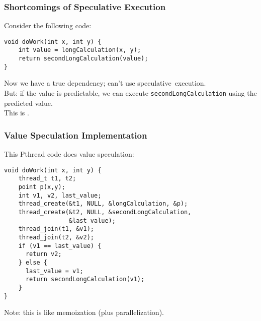 \begin{frame}[fragile]
  \frametitle{Shortcomings of Speculative Execution}

  
  Consider the following code:
  
  \begin{lstlisting}
void doWork(int x, int y) {
    int value = longCalculation(x, y);
    return secondLongCalculation(value);
}
  \end{lstlisting}

  Now we have a true dependency; can't use speculative~execution.\\[1em]

  But: if the value is predictable, we can execute
      {\tt secondLongCalculation} using the predicted value.\\[1em]

  This is .
  
\end{frame}

\begin{frame}[fragile]
  \frametitle{Value Speculation Implementation}

  
  This Pthread code does value speculation:
  
  \begin{lstlisting}
void doWork(int x, int y) {
    thread_t t1, t2;
    point p(x,y);
    int v1, v2, last_value;
    thread_create(&t1, NULL, &longCalculation, &p);
    thread_create(&t2, NULL, &secondLongCalculation,
                  &last_value);
    thread_join(t1, &v1);
    thread_join(t2, &v2);
    if (v1 == last_value) {
      return v2;
    } else {
      last_value = v1;
      return secondLongCalculation(v1);
    }
}
  \end{lstlisting}

  Note: this is like memoization (plus parallelization).
  
\end{frame}


